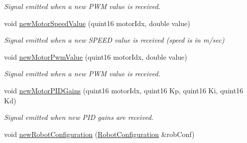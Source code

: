 \begin{DoxyCompactItemize}
\begin{DoxyCompactList}\small\item\em Signal emitted when a new P\-W\-M value is received. \end{DoxyCompactList}\item 
\hypertarget{classroboctrl_1_1_robo_controller_s_d_k_abd8a8b44c6abfbc8c74e8ef555f3a6a4}{void \hyperlink{classroboctrl_1_1_robo_controller_s_d_k_abd8a8b44c6abfbc8c74e8ef555f3a6a4}{new\-Motor\-Speed\-Value} (quint16 motor\-Idx, double value)}\label{classroboctrl_1_1_robo_controller_s_d_k_abd8a8b44c6abfbc8c74e8ef555f3a6a4}

\begin{DoxyCompactList}\small\item\em Signal emitted when a new S\-P\-E\-E\-D value is received (speed is in m/sec) \end{DoxyCompactList}\item 
\hypertarget{classroboctrl_1_1_robo_controller_s_d_k_a48a91cbaae37dd8f6ca67c90504c10e9}{void \hyperlink{classroboctrl_1_1_robo_controller_s_d_k_a48a91cbaae37dd8f6ca67c90504c10e9}{new\-Motor\-Pwm\-Value} (quint16 motor\-Idx, double value)}\label{classroboctrl_1_1_robo_controller_s_d_k_a48a91cbaae37dd8f6ca67c90504c10e9}

\begin{DoxyCompactList}\small\item\em Signal emitted when a new P\-W\-M value is received. \end{DoxyCompactList}\item 
\hypertarget{classroboctrl_1_1_robo_controller_s_d_k_a79e70831349070cde327df8ad6be33cb}{void \hyperlink{classroboctrl_1_1_robo_controller_s_d_k_a79e70831349070cde327df8ad6be33cb}{new\-Motor\-P\-I\-D\-Gains} (quint16 motor\-Idx, quint16 Kp, quint16 Ki, quint16 Kd)}\label{classroboctrl_1_1_robo_controller_s_d_k_a79e70831349070cde327df8ad6be33cb}

\begin{DoxyCompactList}\small\item\em Signal emitted when new P\-I\-D gains are received. \end{DoxyCompactList}\item 
\hypertarget{classroboctrl_1_1_robo_controller_s_d_k_a3390df210714579ef9515452780f73ac}{void \hyperlink{classroboctrl_1_1_robo_controller_s_d_k_a3390df210714579ef9515452780f73ac}{new\-Robot\-Configuration} (\hyperlink{struct___robot_configuration}{Robot\-Configuration} \&rob\-Conf)}\label{classroboctrl_1_1_robo_controller_s_d_k_a3390df210714579ef9515452780f73ac}


\end{DoxyCompactItemize}
